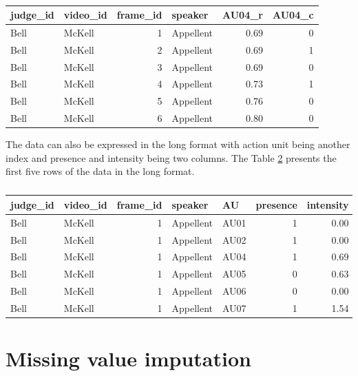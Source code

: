 \documentclass{monashthesis}
\begin{document}
\begin{table}[t]

\caption{\label{tab:unnamed-chunk-2}\label{tab:wide}}
\centering
\begin{tabular}{l|l|r|l|r|r}
\hline
judge\_id & video\_id & frame\_id & speaker & AU04\_r & AU04\_c\\
\hline
Bell & McKell & 1 & Appellent & 0.69 & 0\\
\hline
Bell & McKell & 2 & Appellent & 0.69 & 1\\
\hline
Bell & McKell & 3 & Appellent & 0.69 & 0\\
\hline
Bell & McKell & 4 & Appellent & 0.73 & 1\\
\hline
Bell & McKell & 5 & Appellent & 0.76 & 0\\
\hline
Bell & McKell & 6 & Appellent & 0.80 & 0\\
\hline
\end{tabular}
\end{table}

The data can also be expressed in the long format with action unit being another index and presence and intensity being two columns. The Table \ref{tab:long} presents the first five rows of the data in the long format.

\begin{table}[t]

\caption{\label{tab:unnamed-chunk-3}\label{tab:long}}
\centering
\begin{tabular}{l|l|r|l|l|r|r}
\hline
judge\_id & video\_id & frame\_id & speaker & AU & presence & intensity\\
\hline
Bell & McKell & 1 & Appellent & AU01 & 1 & 0.00\\
\hline
Bell & McKell & 1 & Appellent & AU02 & 1 & 0.00\\
\hline
Bell & McKell & 1 & Appellent & AU04 & 1 & 0.69\\
\hline
Bell & McKell & 1 & Appellent & AU05 & 0 & 0.63\\
\hline
Bell & McKell & 1 & Appellent & AU06 & 0 & 0.00\\
\hline
Bell & McKell & 1 & Appellent & AU07 & 1 & 1.54\\
\hline
\end{tabular}
\end{table}

\hypertarget{missing-value-imputation}{%
\section{Missing value imputation}\label{missing-value-imputation}}
\end{document}
